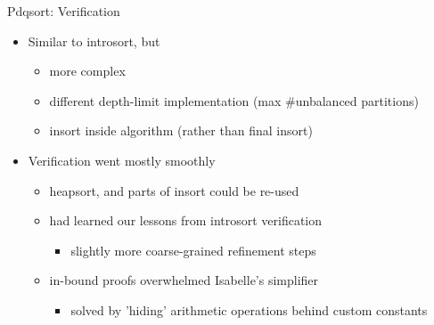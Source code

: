 \documentclass[fleqn]{beamer}
\begin{document}
\begin{frame}{Pdqsort: Verification}
  \begin{itemize}
   \item<+-> Similar to introsort, but
    \begin{itemize}
     \item more complex
     \item different depth-limit implementation (max \#unbalanced partitions)
     \item insort inside algorithm (rather than final insort)
    \end{itemize}
   \item<+-> Verification went mostly smoothly
    \begin{itemize}
     \item heapsort, and parts of insort could be re-used
     \item had learned our lessons from introsort verification
      \begin{itemize}
       \item slightly more coarse-grained refinement steps
      \end{itemize}
     \item in-bound proofs overwhelmed Isabelle's simplifier
      \begin{itemize}
       \item solved by 'hiding' arithmetic operations behind custom constants


%
%
%

      \end{itemize}
    \end{itemize}
  \end{itemize}
\end{frame}
\end{document}

